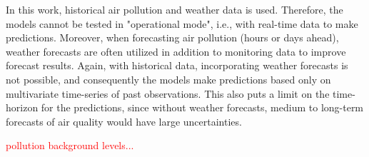 In this work, historical air pollution and weather data is used. Therefore, the models cannot be tested in "operational mode", i.e., with real-time data to make predictions. Moreover, when forecasting air pollution (hours or days ahead), weather forecasts are often utilized in addition to monitoring data to improve forecast results. Again, with historical data, incorporating weather forecasts is not possible, and consequently the models make predictions based only on multivariate time-series of past observations. This also puts a limit on the time-horizon for the predictions, since without weather forecasts, medium to long-term forecasts of air quality would have large uncertainties.  

\textcolor{red}{pollution background levels...}
